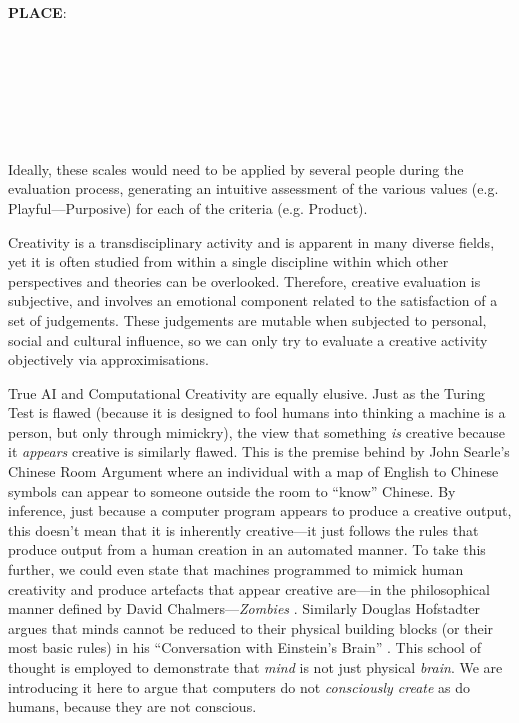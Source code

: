 \noindent \textbf{PLACE}:\\
  \\
  \\
  \\
  \\
  \\
  \\
  \\


Ideally, these scales would need to be applied by several people during the evaluation process, generating an intuitive assessment of the various values (e.g. Playful---Purposive) for each of the criteria (e.g. Product).


\spirals

Creativity is a transdisciplinary activity and is apparent in many diverse fields, yet it is often studied from within a single discipline within which other perspectives and theories can be overlooked. Therefore, creative evaluation is subjective, and involves an emotional component related to the satisfaction of a set of judgements. These judgements are mutable when subjected to personal, social and cultural influence, so we can only try to evaluate a creative activity objectively via approximisations.

True AI and Computational Creativity are equally elusive. Just as the Turing Test \autocite{Turing1950} is flawed (because it is designed to fool humans into thinking a machine is a person, but only through mimickry), the view that something \textit{is} creative because it \textit{appears} creative is similarly flawed. This is the premise behind by John Searle's Chinese Room Argument \autocite{Searle1980} where an individual with a map of English to Chinese symbols can appear to someone outside the room to ``know'' Chinese. By inference, just because a computer program appears to produce a creative output, this doesn't mean that it is inherently creative---it just follows the rules that produce output from a human creation in an automated manner. To take this further, we could even state that machines programmed to mimick human creativity and produce artefacts that appear creative are---in the philosophical manner defined by David Chalmers---\textit{Zombies} \autocite{Chalmers1996}. Similarly Douglas Hofstadter argues that minds cannot be reduced to their physical building blocks (or their most basic rules) in his ``Conversation with Einstein's Brain'' \autocite{Hofstadter1981}. This school of thought is employed to demonstrate that \textit{mind} is not just physical \textit{brain}. We are introducing it here to argue that computers do not \textit{consciously create} as do humans, because they are not conscious.

